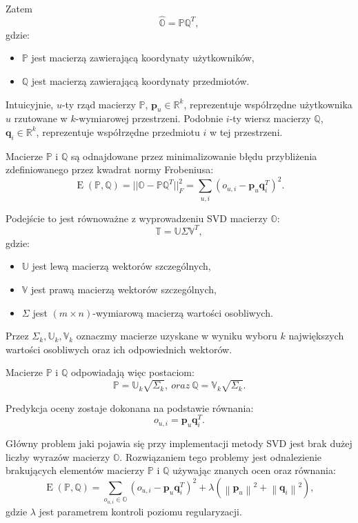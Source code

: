 \documentclass[12pt,a4paper]{report}
\newcommand{\setR}{\mathbb{R}}
\newcommand{\norm}[2][]{\left\| {#2} \right\|_{#1}}
\newcommand{\e}[1]{\operatorname{E}\left({#1} \right)}
\begin{document}
Zatem
$$
\widehat{\mathbb{O}} = \mathbb{P}\mathbb{Q}^T,
$$
gdzie:
\begin{itemize}
\item $\mathbb{P}$ jest macierzą zawierającą koordynaty użytkowników,
\item $\mathbb{Q}$ jest macierzą zawierającą koordynaty przedmiotów.
\end{itemize}

Intuicyjnie, $u$-ty rząd macierzy $\mathbb{P}$, $\mathbf{p}_u \in \setR^k$, reprezentuje współrzędne użytkownika $u$ rzutowane w $k$-wymiarowej przestrzeni. Podobnie $i$-ty wiersz macierzy $\mathbb{Q}$, $\mathbf{q}_i \in \setR^k$, reprezentuje współrzędne przedmiotu $i$ w tej przestrzeni.

Macierze $\mathbb{P}$ i $\mathbb{Q}$ są odnajdowane przez minimalizowanie błędu przybliżenia zdefiniowanego przez kwadrat normy Frobeniusa:
$$
\e{\mathbb{P}, \mathbb{Q}} = ||\mathbb{O}-\mathbb{P} \mathbb{Q}^T||_F^2 = \sum_{u,i}(o_{u,i} - \mathbf{p}_u\mathbf{q}_i^T)^2.
$$

Podejście to jest równoważne z wyprowadzeniu SVD macierzy $\mathbb{O}$:
$$
\mathbb{T} = \mathbb{U} \Sigma \mathbb{V}^T,
$$
gdzie:
\begin{itemize}
\item $\mathbb{U}$ jest lewą macierzą wektorów szczególnych,
\item $\mathbb{V}$ jest prawą macierzą wektorów szczególnych,
\item $\Sigma$ jest $(m\times n)$-wymiarową macierzą wartości osobliwych.
\end{itemize}

Przez $\Sigma_k, \mathbb{U}_k, \mathbb{V}_k$ oznaczmy macierze uzyskane w wyniku wyboru $k$ największych wartości osobliwych oraz ich odpowiednich wektorów. 

Macierze $\mathbb{P}$ i $\mathbb{Q}$ odpowiadają więc postaciom:
$$
\mathbb{P}=\mathbb{U}_k \sqrt{\Sigma_k}, \: oraz \: \mathbb{Q}=\mathbb{V}_k \sqrt{\Sigma_k}.
$$

Predykcja oceny zostaje dokonana na podstawie równania:
$$
o_{u,i} = \mathbf{p}_u \mathbf{q}_i^T.
$$

Główny problem jaki pojawia się przy implementacji metody SVD jest brak dużej liczby wyrazów macierzy $\mathbb{O}$. 
Rozwiązaniem tego problemy jest odnalezienie brakujących elementów macierzy $\mathbb{P}$ i $\mathbb{Q}$ używając znanych ocen oraz równania:
$$
\e{\mathbb{P}, \mathbb{Q}} = \sum_{o_{u,i} \in \mathbb{O}}(o_{u,i} - \mathbf{p}_u\mathbf{q}_i^T)^2 + \lambda(\norm{\mathbf{p}_u}^2 + \norm{\mathbf{q}_i}^2),
$$
gdzie $\lambda$ jest parametrem kontroli poziomu regularyzacji.
\end{document}
